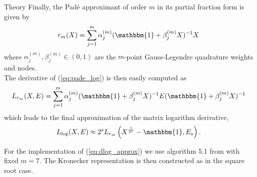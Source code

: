\begin{chapter}{Theory}
Finally, the Pad\'{e} approximant of order $m$ in its partial fraction form \cite{HighamPade} is given by
\begin{equation}
    \label{eq:pade_log}
    r_m(X) = \sum_{j=1}^{m}\alpha_j^{(m)}(\mathbbm{1}+\beta_j^{(m)}X)^{-1}X
\end{equation}
where $\alpha_{j}^{(m)},\beta_{j}^{(m)}\in (0,1)$ are the $m$-point Gauss-Legendre quadrature weights and nodes.\\

The derivative of (\ref{eq:pade_log}) is then easily computed as 
\begin{equation}
    L_{r_m}(X,E) = \sum_{j=1}^m\alpha_j^{(m)}(\mathbbm{1}+\beta_j^{(m)}X)^{-1}E(\mathbbm{1}+\beta_j^{(m)}X)^{-1}
\end{equation}
which leads to the final approximation of the matrix logarithm derivative, 
\begin{equation}
    \label{eq:dlog_approx}
    L_{\log}(X,E)\approx 2^{s}L_{r_m}\left(X^{\frac{1}{2^s}}-\mathbbm{1},E_s \right).
\end{equation}

For the implementation of (\ref{eq:dlog_approx}) we use algorithm 5.1 from \cite{AlmohyFrechet} with fixed $m=7$.
The Kronecker representation is then constructed as in the square root case.








\end{chapter}
